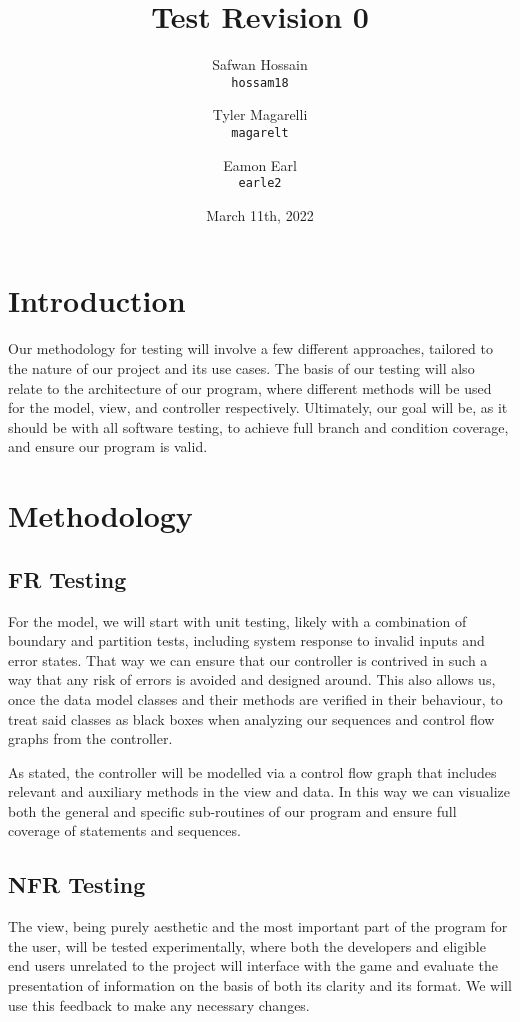 \documentclass{article}
\title{Test Revision 0}
\author{
  Safwan Hossain\\
  \texttt{hossam18}\\
  \and
  Tyler Magarelli\\
  \texttt{magarelt}\\
  \and
  Eamon Earl\\
  \texttt{earle2}
}
\date{March 11th, 2022}
\begin{document}
\maketitle

\section{Introduction}

Our methodology for testing will involve a few different approaches, tailored to the nature of our project and its use cases. The basis of our testing will also relate to the architecture of our program, where different methods will be used for the model, view, and controller respectively. Ultimately, our goal will be, as it should be with all software testing, to achieve full branch and condition coverage, and ensure our program is valid. 

\section{Methodology}

\subsection{FR Testing}

For the model, we will start with unit testing, likely with a combination of boundary and partition tests, including system response to invalid inputs and error states. That way we can ensure that our controller is contrived in such a way that any risk of errors is avoided and designed around. This also allows us, once the data model classes and their methods are verified in their behaviour, to treat said classes as black boxes when analyzing our sequences and control flow graphs from the controller.

As stated, the controller will be modelled via a control flow graph that includes relevant and auxiliary methods in the view and data. In this way we can visualize both the general and specific sub-routines of our program and ensure full coverage of statements and sequences. 

\subsection{NFR Testing}

The view, being purely aesthetic and the most important part of the program for the user, will be tested experimentally, where both the developers and eligible end users unrelated to the project will interface with the game and evaluate the presentation of information on the basis of both its clarity and its format. We will use this feedback to make any necessary changes.
\end{document}
